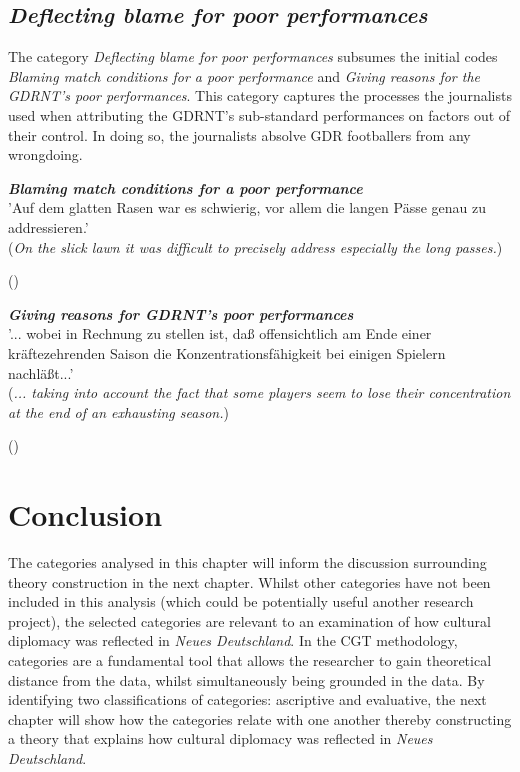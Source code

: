 \subsection*{\textit{Deflecting blame for poor performances}}

The category \textit{Deflecting blame for poor performances} subsumes the initial codes \textit{Blaming match conditions for a poor performance} and \textit{Giving reasons for the GDRNT’s poor performances}. This category captures the processes the journalists used when attributing the GDRNT’s sub-standard performances on factors out of their control. In doing so, the journalists absolve GDR footballers from any wrongdoing.

\begin{displayquote}
\begin{small}
\textbf{\textit{Blaming match conditions for a poor performance}}\\
'Auf dem glatten Rasen war es schwierig, vor allem die langen Pässe genau zu addressieren.'\\
(\textit{On the slick lawn it was difficult to precisely address especially the long passes.})\
\begin{flushright}\footnotesize (\cite{nd19740619})\end{flushright}
\end{small}
\end{displayquote}

\begin{displayquote}
\begin{small}
\textbf{\textit{Giving reasons for GDRNT’s poor performances}}\\
'... wobei in Rechnung zu stellen ist, daß offensichtlich am Ende einer kräftezehrenden Saison die Konzentrationsfähigkeit bei einigen Spielern nachläßt...'\\
(\textit{... taking into account the fact that some players seem to lose their concentration at the end of an exhausting season.})\
\begin{flushright}\footnotesize (\cite{nd19740328})\end{flushright}
\end{small}
\end{displayquote}

\section*{Conclusion}

The categories analysed in this chapter will inform the discussion surrounding theory construction in the next chapter. Whilst other categories have not been included in this analysis (which could be potentially useful another research project), the selected categories are relevant to an examination of how cultural diplomacy was reflected in \textit{Neues Deutschland}. In the CGT methodology, categories are a fundamental tool that allows the researcher to gain theoretical distance from the data, whilst simultaneously being grounded in the data. By identifying two classifications of categories: ascriptive and evaluative, the next chapter will show how the categories relate with one another thereby constructing a theory that explains how cultural diplomacy was reflected in \textit{Neues Deutschland}. 